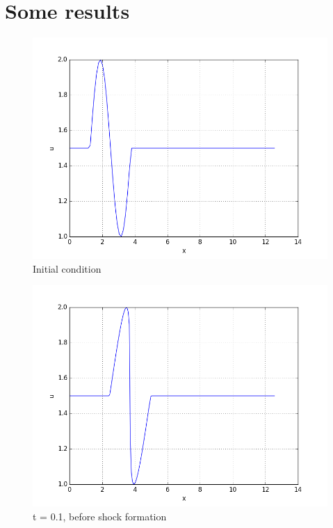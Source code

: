 \documentclass{article}
\begin{document}

\section{Some results}

\begin{figure}
	\includegraphics[scale=0.5]{hp-sol-n100-init}
	\caption{Initial condition}
\end{figure}
 

\begin{figure}
	\includegraphics[scale=0.5]{hp-sol-t01}
	\caption{t = 0.1, before shock formation}
\end{figure}
 
\end{document}
